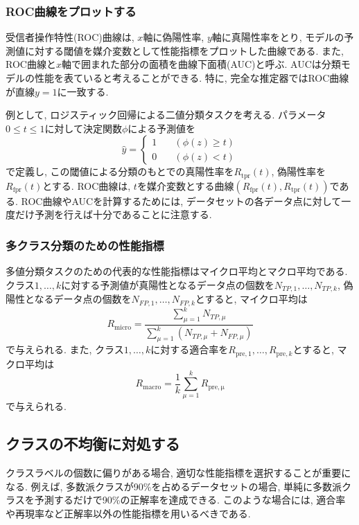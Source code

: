 \documentclass[uplatex]{jsarticle}
\theoremstyle{definition}
\numberwithin{equation}{section}
\begin{document}
\subsubsection{ROC曲線をプロットする}
受信者操作特性(ROC)曲線は, $x$軸に偽陽性率, $y$軸に真陽性率をとり, モデルの予測値に対する閾値を媒介変数として性能指標をプロットした曲線である.
また, ROC曲線と$x$軸で囲まれた部分の面積を曲線下面積(AUC)と呼ぶ.
AUCは分類モデルの性能を表ていると考えることができる.
特に, 完全な推定器ではROC曲線が直線$y = 1$に一致する.

例として, ロジスティック回帰による二値分類タスクを考える. 
パラメータ$0 \leq t \leq 1$に対して決定関数$\phi$による予測値を
\begin{equation}
    \hat{y} =
    \begin{cases}
        1 &\quad (\phi(z) \geq t) \\
        0 &\quad (\phi(z) < t)
    \end{cases}
\end{equation}
で定義し, この閾値による分類のもとでの真陽性率を$R_{\mathrm{tpr}}(t)$, 偽陽性率を$R_{\mathrm{fpr}}(t)$とする.
ROC曲線は, $t$を媒介変数とする曲線$(R_{\mathrm{fpr}}(t), R_{\mathrm{tpr}}(t))$である.
ROC曲線やAUCを計算するためには, データセットの各データ点に対して一度だけ予測を行えば十分であることに注意する.

\subsubsection{多クラス分類のための性能指標}
多値分類タスクのための代表的な性能指標はマイクロ平均とマクロ平均である.
クラス$1, \dots, k$に対する予測値が真陽性となるデータ点の個数を$N_{TP, 1}, \dots, N_{TP, k}$, 偽陽性となるデータ点の個数を$N_{FP, 1}, \dots, N_{FP, k}$とすると, マイクロ平均は
\begin{equation}
    R_{\mathrm{micro}} = \frac{\sum_{\mu = 1}^{k} N_{TP, \mu}}{\sum_{\mu = 1}^{k} (N_{TP, \mu} + N_{FP, \mu})}
\end{equation}
で与えられる.
また, クラス$1, \dots, k$に対する適合率を$R_{\mathrm{pre}, 1}, \dots, R_{\mathrm{pre}, k}$とすると, マクロ平均は
\begin{equation}
    R_{\mathrm{macro}} = \frac{1}{k}\sum_{\mu = 1}^{k} R_{\mathrm{pre, \mu}}
\end{equation}
で与えられる.

\subsection{クラスの不均衡に対処する}
クラスラベルの個数に偏りがある場合, 適切な性能指標を選択することが重要になる.
例えば, 多数派クラスが90\%を占めるデータセットの場合, 単純に多数派クラスを予測するだけで90\%の正解率を達成できる.
このような場合には, 適合率や再現率など正解率以外の性能指標を用いるべきである.
\end{document}
